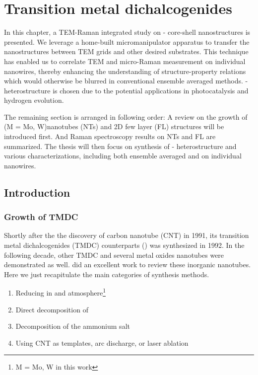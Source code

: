 
\chapter{Transition metal dichalcogenides}

In this chapter, a TEM-Raman integrated study on - core-shell nanostructures is presented. We leverage a home-built micromanipulator apparatus to transfer the nanostructures between TEM grids and other desired substrates. This technique has enabled us to correlate TEM and micro-Raman measurement on individual nanowires, thereby enhancing the understanding of structure-property relations which would otherwise be blurred in conventional ensemble averaged methods. - heterostructure is chosen due to the potential applications in photocatalysis and hydrogen evolution. 

The remaining section is arranged in following order: A review on the growth of  (M = Mo, W)nanotubes (NTs) and 2D few layer (FL) structures will be introduced first. And Raman spectroscopy results on NTs and FL are summarized. The thesis will then focus on synthesis of - heterostructure and various characterizations, including both ensemble averaged and on individual nanowires. 


\section{Introduction}

\subsection{Growth of TMDC}
Shortly after the the discovery of carbon nanotube (CNT) in 1991,\cite{Iijima1991} its transition metal dichalcogenides (TMDC) counterparts () was synthesized in 1992.\cite{Tenne1992} In the following decade, other TMDC and several metal oxides nanotubes were demonstrated as well. \citeauthor{Rao2003} did an excellent work to review these inorganic nanotubes.\cite{Rao2003} Here we just recapitulate the main categories of synthesis methods.
\begin{enumerate}
\item Reducing  in  and  atmosphere\footnote{M = Mo, W in this work}
\item Direct decomposition of 
\item Decomposition of the ammonium salt 
\item Using CNT as templates, arc discharge, or laser ablation
\end{enumerate}

